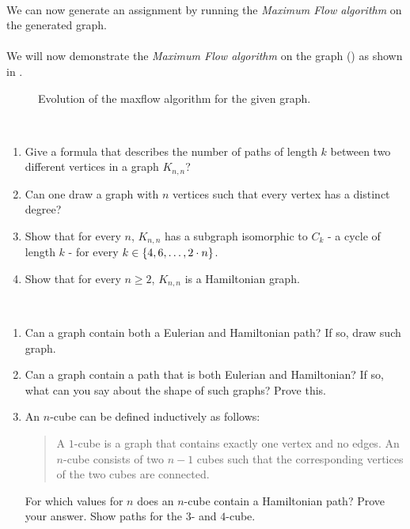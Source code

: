 \documentclass{article}
\begin{document}
\begin{exercise}
\begin{answer}
\paragraph{}
We can now generate an assignment by running the \emph{Maximum Flow algorithm} on the generated graph.
\paragraph{}
We will now demonstrate the \emph{Maximum Flow algorithm} on the graph () as shown in .
\begin{figure}
\caption{Evolution of the maxflow algorithm for the given graph.}
\end{figure}
\end{answer}
\end{exercise}
\begin{exercise}~~
\begin{enumerate}
 \item Give a formula that describes the number of paths of length $k$ between two different vertices in a graph $K_{n,n}$?
 \item Can one draw a graph with $n$ vertices such that every vertex has a distinct degree?
 \item Show that for every $n$, $K_{n,n}$ has a subgraph isomorphic to $C_k$ - a cycle of length $k$ - for every $k\in\left\{ 4,6,\ldots,2\cdot n \right\}$.
 \item Show that for every $n\geq 2$, $K_{n,n}$ is a Hamiltonian graph.
\end{enumerate}

\end{exercise}
\begin{exercise}~~
\begin{enumerate}
 \item Can a graph contain both a Eulerian and Hamiltonian path? If so, draw such graph.
 \item Can a graph contain a path that is both Eulerian and Hamiltonian? If so, what can you say about the shape of such graphs? Prove this.
 \item An $n$-cube can be defined inductively as follows:
 \begin{quote}
  \begin{definition}[$n$-cube]
   A $1$-cube is a graph that contains exactly one vertex and no edges. An $n$-cube consists of two $n-1$ cubes such that the corresponding vertices of the two cubes are connected.
  \end{definition}
 \end{quote}
 For which values for $n$ does an $n$-cube contain a Hamiltonian path? Prove your answer. Show paths for the $3$- and $4$-cube.
\end{enumerate}
\end{exercise}
\end{document}
